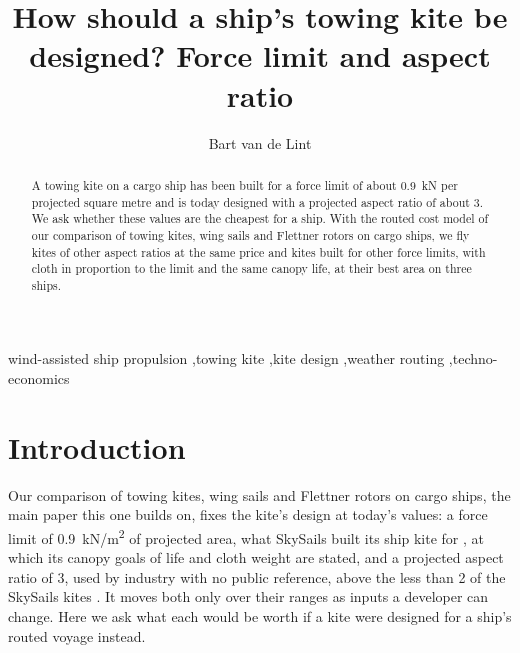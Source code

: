 \documentclass[3p,times,authoryear]{elsarticle}
\begin{document}
\begin{frontmatter}

\title{How should a ship's towing kite be designed? Force limit and aspect ratio}

\author[1]{Bart van de Lint}

\begin{abstract}
 A towing kite on a cargo ship has been built for a force limit of about \SI{0.9}{kN} per projected square metre and is today designed with a projected aspect ratio of about 3. We ask whether these values are the cheapest for a ship. With the routed cost model of our comparison of towing kites, wing sails and Flettner rotors on cargo ships, we fly kites of other aspect ratios at the same price and kites built for other force limits, with cloth in proportion to the limit and the same canopy life, at their best area on three ships.  
\end{abstract}

\begin{keyword}
wind-assisted ship propulsion \sep towing kite \sep kite design \sep weather routing \sep techno-economics
\end{keyword}

\end{frontmatter}

\section{Introduction}
\label{sec:intro}

Our comparison of towing kites, wing sails and Flettner rotors on cargo ships, the main paper this one builds on, fixes the kite's design at today's values: a force limit of \SI{0.9}{kN/m^2} of projected area, what SkySails built its ship kite for \citep{paulig2013,folkersma2020}, at which its canopy goals of life and cloth weight are stated, and a projected aspect ratio of 3, used by industry with no public reference, above the less than 2 of the SkySails kites \citep{paulig2013,folkersma2020}. It moves both only over their ranges as inputs a developer can change. Here we ask what each would be worth if a kite were designed for a ship's routed voyage instead.
\end{document}
